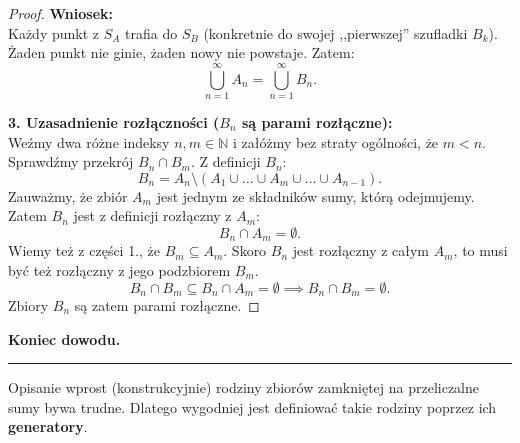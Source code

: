 \begin{proof}
    \noindent\textbf{Wniosek:} \\
    Każdy punkt z $S_A$ trafia do $S_B$ (konkretnie do swojej ,,pierwszej'' szufladki $B_k$). Żaden punkt nie ginie, żaden nowy nie powstaje. Zatem:
    \[
        \bigcup_{n=1}^{\infty} A_n = \bigcup_{n=1}^{\infty} B_n.
    \]

    \noindent\textbf{3. Uzasadnienie rozłączności ($B_n$ są parami rozłączne):} \\
    Weźmy dwa różne indeksy $n, m \in \mathbb{N}$ i załóżmy bez straty ogólności, że $m < n$.
    Sprawdźmy przekrój $B_n \cap B_m$.
    Z definicji $B_n$:
    \[
        B_n = A_n \setminus \left( A_1 \cup \dots \cup A_m \cup \dots \cup A_{n-1} \right).
    \]
    Zauważmy, że zbiór $A_m$ jest jednym ze składników sumy, którą odejmujemy. Zatem $B_n$ jest z definicji rozłączny z $A_m$:
    \[
        B_n \cap A_m = \emptyset.
    \]
    Wiemy też z części 1., że $B_m \subseteq A_m$. Skoro $B_n$ jest rozłączny z całym $A_m$, to musi być też rozłączny z jego podzbiorem $B_m$.
    \[
        B_n \cap B_m \subseteq B_n \cap A_m = \emptyset \implies B_n \cap B_m = \emptyset.
    \]
    Zbiory $B_n$ są zatem parami rozłączne.
\end{proof} 

\textbf{Koniec dowodu.}
\hrule
\vspace{1em}
Opisanie wprost (konstrukcyjnie) rodziny zbiorów zamkniętej na przeliczalne sumy bywa trudne. Dlatego wygodniej jest definiować takie rodziny poprzez ich \textbf{generatory}.

